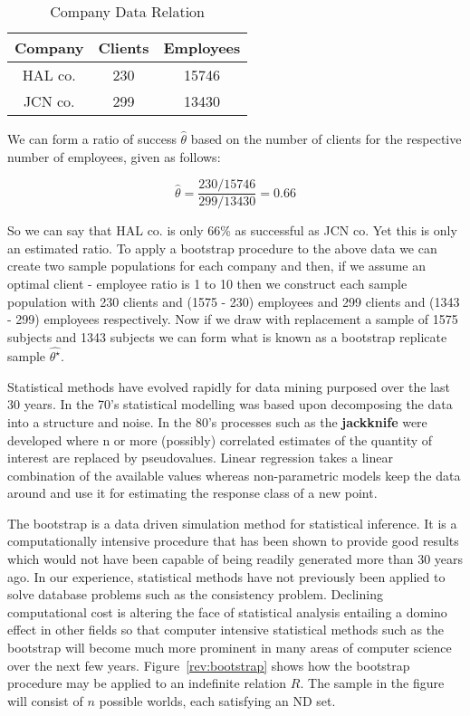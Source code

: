 \begin{table}[ht]
\begin{center}
\begin{tabular}{|c|c|c|} \hline
Company & Clients & Employees \\ \hline
HAL co.	& 230		& 15746 \\
JCN co. & 299 		& 13430 \\ \hline
\end{tabular}
\end{center}
\caption{\label{table:3.01} Company Data Relation}
\end{table}

We can form a ratio of success $\hat{\theta}$ based on the number of clients
for the respective number of employees, given as follows:

\begin{displaymath}
\hat{\theta} = \frac{230 / 15746}{299 / 13430} = 0.66
\end{displaymath}

So we can say that HAL co. is only 66\% as successful as JCN co. Yet
this is only an estimated ratio. To apply a bootstrap procedure to
the above data we can create two sample populations for each
company and then, if we assume an optimal client - employee ratio is
1 to 10 then we construct each sample population with 230 clients and
(1575 - 230) employees and 299 clients and (1343 - 299) employees respectively.
Now if we draw with replacement a sample of 1575 subjects and 1343 subjects
we can form what is known as a bootstrap replicate sample $\hat{\theta^\star}$.
\medskip

Statistical methods have evolved rapidly for data mining purposed over
the last 30 years. In the 70's statistical modelling was based upon
decomposing the data into a structure and noise.  In the 80's
processes such as the {\bf jackknife} were developed where n or more
(possibly) correlated estimates of the quantity of interest are
replaced by pseudovalues. Linear regression takes a linear combination
of the available values whereas non-parametric models keep the data
around and use it for estimating the response class of a new point.


The bootstrap \cite{efro79,de83,et93,coh95} is a data driven
simulation method for statistical inference. It is a computationally
intensive procedure that has been shown to provide good results which
would not have been capable of being readily generated more than 30 years ago.
In our experience, statistical methods have not previously been 
applied to solve database problems such as the consistency problem.
Declining computational cost is altering the face of statistical analysis
entailing a domino effect in other fields so that computer
intensive statistical methods such as the bootstrap will become much
more prominent in many areas of computer science over the next few years.
Figure~\ref{rev:bootstrap} shows how the
bootstrap procedure may be applied to an indefinite relation $R$. The
sample in the figure will consist of $n$ possible worlds, each
satisfying an ND set.



